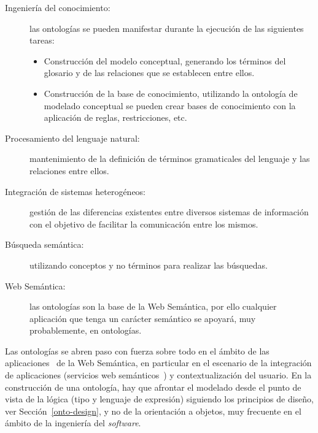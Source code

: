 \begin{description}
\item[Ingeniería del conocimiento:] las ontologías se pueden manifestar durante la ejecución de las siguientes tareas:
\begin{itemize}
  \item Construcción del modelo conceptual, generando los términos del glosario
  y de las relaciones que se establecen entre ellos.
  \item Construcción de la base de conocimiento, utilizando la ontología de
  modelado conceptual se pueden crear bases de conocimiento con la aplicación de
  reglas, restricciones, etc.
\end{itemize}

\item[Procesamiento del lenguaje natural:] mantenimiento de la definición de términos
gramaticales del lenguaje y las relaciones entre ellos.

\item[Integración de sistemas heterogéneos:] gestión de las diferencias
existentes entre diversos sistemas de información con el objetivo de facilitar
la comunicación entre los mismos.
\item[Búsqueda semántica:] utilizando conceptos y no términos para realizar las
búsquedas. 

\item[Web Semántica:] las ontologías son la base de la Web Semántica, por ello
cualquier aplicación que tenga un carácter semántico se apoyará, muy
probablemente, en ontologías.
\end{description}


Las ontologías se abren paso con fuerza sobre todo en el ámbito de las
aplicaciones~\cite{DBLP:conf/nldb/Penalver-MartinezVS11} de la Web Semántica, en particular en el escenario de la
integración de aplicaciones (servicios web semánticos~\cite{DBLP:journals/es/SanchezSMAVG11}) y contextualización del
usuario. En la construcción de una ontología, hay que afrontar el modelado desde el
punto de vista de la lógica (tipo y lenguaje de expresión) siguiendo los
principios de diseño, ver Sección~\ref{onto-design}, y no de la orientación a objetos, muy frecuente en el ámbito de la ingeniería del \textit{software}.  
